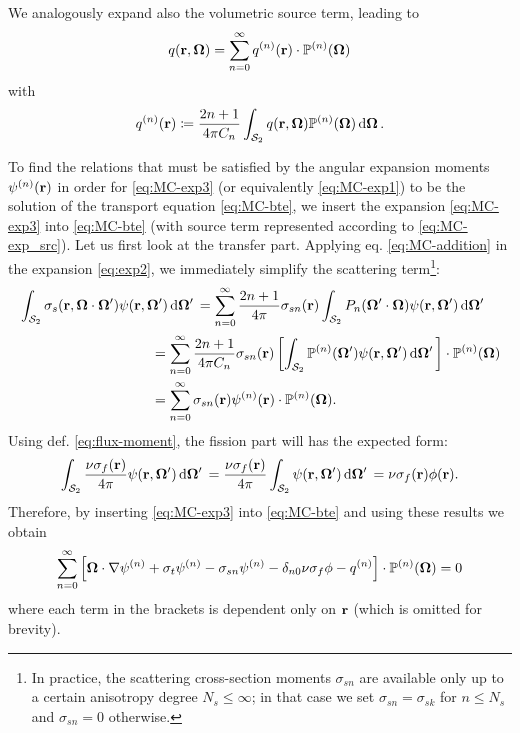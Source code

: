 We analogously expand also the volumetric source term, leading to 
\begin{equation}\label{eq:MC-exp_src}
  q(\br,\bomega) = \suma[n]{0}{\infty}\qmom(\br)\contr\PP(\bomega)
\end{equation}
with
\begin{equation*}
  \qmom(\br) \coloneqq \frac{2n+1}{4\pi C_n}\intA{q(\br,\bomega)\PP(\bomega)}.
\end{equation*}

To find the relations that must be satisfied by the angular expansion moments $\fmom(\br)$ in order for
\eqref{eq:MC-exp3} (or equivalently \eqref{eq:MC-exp1}) to be the solution of the transport equation \eqref{eq:MC-bte},
we insert the expansion \eqref{eq:MC-exp3} into \eqref{eq:MC-bte} (with source term represented according to \eqref{eq:MC-exp_src}).
Let us first look at the transfer part.
Applying eq. \eqref{eq:MC-addition} in the expansion \eqref{eq:exp2}, we immediately simplify the scattering
term\footnote{In practice, the scattering cross-section moments $\sigma_{sn}$ are available only up to a
certain anisotropy degree $N_s \leq \infty$; in that case we set $\sigma_{sn} = \sigma_{sk}$ for $n
\leq N_s$ and $\sigma_{sn} = 0$ otherwise.}:
\begin{equation*}%
  \begin{multlined}
  \intA[']{\sigma_s(\br,\bomega\cdot\bomega')\psi(\br,\bomega')} = 
    \suma[n]{0}{\infty}
    \frac{2n+1}{4\pi}\sigma_{sn}(\br)\intA[']{P_n(\bomega'\cdot\bomega)\psi(\br,\bomega')}\\[.1em]
   \begin{aligned}
     &= \suma[n]{0}{\infty}
    \frac{2n+1}{4\pi C_n}\sigma_{sn}(\br)\left[\intA[']{\PP(\bomega')\psi(\br,\bomega')}\right]\contr\PP(\bomega)\\
     &= \suma[n]{0}{\infty}
    \sigma_{sn}(\br)\fmom(\br)\contr\PP(\bomega).
   	\end{aligned}
    \end{multlined}
\end{equation*}
Using def. \eqref{eq:flux-moment}, the fission part will has the expected form:
\begin{equation}%
  \intA[']{\frac{\nu\sigma_f(\br)}{4\pi}\psi(\br,\bomega')} = 
  \frac{\nu\sigma_f(\br)}{4\pi}\intA[']{\psi(\br,\bomega')} = 
     \nu\sigma_f(\br)\phi(\br).
\end{equation}
Therefore, by inserting \eqref{eq:MC-exp3} into \eqref{eq:MC-bte} and using these results we obtain
\begin{equation}\label{eq:MC-bte2}
  \suma[n]{0}{\infty}\left[\bomega\cdot\nabla\fmom + \sigma_t\fmom 
  - \sigma_{sn}\fmom[n] - \kron{n}{0}\nu\sigma_f\phi - \qmom\right]\contr\PP(\bomega) = 0
\end{equation}
where each term in the brackets is dependent only on $\br$ (which is omitted for brevity).

